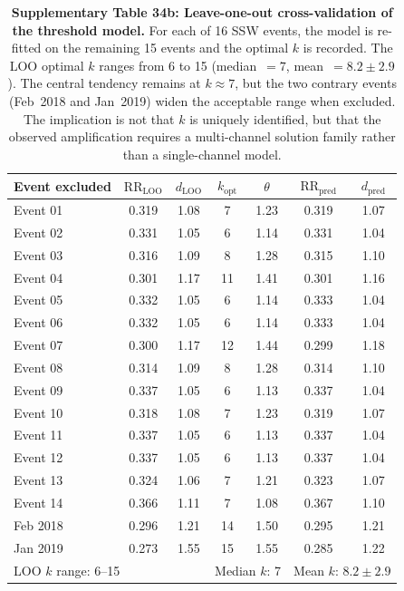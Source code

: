 \documentclass[11pt,letterpaper]{article}
\begin{document}
\begin{table}[h!]
\centering
\caption{\textbf{Supplementary Table 34b: Leave-one-out cross-validation of the threshold model.} For each of 16 SSW events, the model is re-fitted on the remaining 15 events and the optimal $k$ is recorded. The LOO optimal $k$ ranges from 6 to 15 (median~$= 7$, mean~$= 8.2 \pm 2.9$). The central tendency remains at $k \approx 7$, but the two contrary events (Feb~2018 and Jan~2019) widen the acceptable range when excluded. The implication is not that $k$ is uniquely identified, but that the observed amplification requires a multi-channel solution family rather than a single-channel model.}
\label{tab:threshold_loo}
\begin{tabular}{lcccccc}
\toprule
Event excluded & $\mathrm{RR}_{\mathrm{LOO}}$ & $d_{\mathrm{LOO}}$ & $k_{\mathrm{opt}}$ & $\theta$ & $\mathrm{RR}_{\mathrm{pred}}$ & $d_{\mathrm{pred}}$ \\
\midrule
Event 01 & 0.319 & 1.08 & 7 & 1.23 & 0.319 & 1.07 \\
Event 02 & 0.331 & 1.05 & 6 & 1.14 & 0.331 & 1.04 \\
Event 03 & 0.316 & 1.09 & 8 & 1.28 & 0.315 & 1.10 \\
Event 04 & 0.301 & 1.17 & 11 & 1.41 & 0.301 & 1.16 \\
Event 05 & 0.332 & 1.05 & 6 & 1.14 & 0.333 & 1.04 \\
Event 06 & 0.332 & 1.05 & 6 & 1.14 & 0.333 & 1.04 \\
Event 07 & 0.300 & 1.17 & 12 & 1.44 & 0.299 & 1.18 \\
Event 08 & 0.314 & 1.09 & 8 & 1.28 & 0.314 & 1.10 \\
Event 09 & 0.337 & 1.05 & 6 & 1.13 & 0.337 & 1.04 \\
Event 10 & 0.318 & 1.08 & 7 & 1.23 & 0.319 & 1.07 \\
Event 11 & 0.337 & 1.05 & 6 & 1.13 & 0.337 & 1.04 \\
Event 12 & 0.337 & 1.05 & 6 & 1.13 & 0.337 & 1.04 \\
Event 13 & 0.324 & 1.06 & 7 & 1.21 & 0.323 & 1.07 \\
Event 14 & 0.366 & 1.11 & 7 & 1.08 & 0.367 & 1.10 \\
Feb 2018 & 0.296 & 1.21 & 14 & 1.50 & 0.295 & 1.21 \\
Jan 2019 & 0.273 & 1.55 & 15 & 1.55 & 0.285 & 1.22 \\
\midrule
\multicolumn{3}{l}{LOO $k$ range: 6--15} & \multicolumn{2}{l}{Median $k$: 7} & \multicolumn{2}{l}{Mean $k$: $8.2 \pm 2.9$} \\
\bottomrule
\end{tabular}
\end{table}
\end{document}
